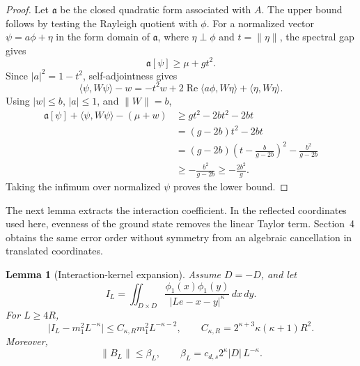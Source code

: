 \documentclass[twoside,10pt]{article}
\numberwithin{equation}{section}
\theoremstyle{slbody}
\newtheorem{lemma}[theorem]{Lemma}
\theoremstyle{definition}
\newcommand{\ip}[2]{\langle #1,#2\rangle}
\newcommand{\norm}[1]{\lVert #1\rVert}
\newcommand{\abs}[1]{\lvert #1\rvert}
\begin{document}
\begin{proof}
Let $\mathfrak a$ be the closed quadratic form associated with $A$.  The upper
bound follows by testing the Rayleigh quotient with $\phi$.  For a normalized
vector $\psi=a\phi+\eta$ in the form domain of $\mathfrak a$,
where $\eta\perp\phi$ and $t=\norm{\eta}$, the spectral gap gives
\[
 \mathfrak a[\psi]\geq\mu+gt^2.
\]
Since $\abs{a}^2=1-t^2$, self-adjointness gives
\[
 \ip{\psi}{W\psi}-w
 =-t^2w+2\operatorname{Re}\ip{a\phi}{W\eta}+\ip{\eta}{W\eta}.
\]
Using $\abs{w}\leq b$, $\abs{a}\leq1$, and $\norm W=b$,
\begin{align*}
 \mathfrak a[\psi]+\ip{\psi}{W\psi}-(\mu+w)
 &\geq gt^2-2bt^2-2bt\\
 &=(g-2b)t^2-2bt\\
 &= (g-2b)\left(t-\frac{b}{g-2b}\right)^2
   -\frac{b^2}{g-2b}\\
 &\geq-\frac{b^2}{g-2b}
 \geq-\frac{2b^2}{g}.
\end{align*}
Taking the infimum over normalized $\psi$ proves the lower bound.
\end{proof}

The next lemma extracts the interaction coefficient.  In the reflected
coordinates used here, evenness of the ground state removes the linear Taylor
term.  Section~4 obtains the same error order without symmetry from an
algebraic cancellation in translated coordinates.

\begin{samepage}
\begin{lemma}[Interaction-kernel expansion]\label{lem:kernel}
Assume $D=-D$, and let
\[
 I_L=\iint_{D\times D}
 \frac{\phi_1(x)\phi_1(y)}{\abs{Le-x-y}^{\kappa}}\,dx\,dy.
\]
For $L\geq4R$,
\begin{equation}\label{eq:kernel-expansion}
 \abs{I_L-m_1^2L^{-\kappa}}
 \leq C_{\kappa,R}m_1^2L^{-\kappa-2},
 \qquad
 C_{\kappa,R}=2^{\kappa+3}\kappa(\kappa+1)R^2.
\end{equation}
Moreover,
\begin{equation}\label{eq:Bnorm}
 \norm{B_L}\leq \beta_L,
 \qquad
 \beta_L=c_{d,s}2^\kappa\abs D\,L^{-\kappa}.
\end{equation}
\end{lemma}
\end{samepage}
\end{document}
